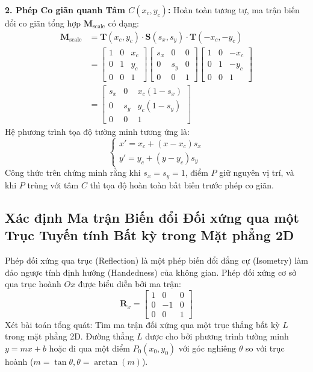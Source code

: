 \textbf{2. Phép Co giãn quanh Tâm $C(x_c, y_c)$:}
Hoàn toàn tương tự, ma trận biến đổi co giãn tổng hợp $\mathbf{M}_{\text{scale}}$ có dạng:
\begin{align}
\label{eq:scale_pivot_composite}
\mathbf{M}_{\text{scale}} &= \mathbf{T}(x_c, y_c) \cdot \mathbf{S}(s_x, s_y) \cdot \mathbf{T}(-x_c, -y_c) \nonumber \\
&= \begin{bmatrix} 1 & 0 & x_c \\ 0 & 1 & y_c \\ 0 & 0 & 1 \end{bmatrix} \begin{bmatrix} s_x & 0 & 0 \\ 0 & s_y & 0 \\ 0 & 0 & 1 \end{bmatrix} \begin{bmatrix} 1 & 0 & -x_c \\ 0 & 1 & -y_c \\ 0 & 0 & 1 \end{bmatrix} \nonumber \\
&= \begin{bmatrix} s_x & 0 & x_c(1 - s_x) \\ 0 & s_y & y_c(1 - s_y) \\ 0 & 0 & 1 \end{bmatrix}
\end{align}
Hệ phương trình tọa độ tường minh tương ứng là:
\begin{equation}
\label{eq:scale_pivot_explicit}
\begin{cases}
x' = x_c + (x - x_c)s_x \\
y' = y_c + (y - y_c)s_y
\end{cases}
\end{equation}
Công thức trên chứng minh rằng khi $s_x = s_y = 1$, điểm $P$ giữ nguyên vị trí, và khi $P$ trùng với tâm $C$ thì tọa độ hoàn toàn bất biến trước phép co giãn.

\subsection{Xác định Ma trận Biến đổi Đối xứng qua một Trục Tuyến tính Bất kỳ trong Mặt phẳng 2D}
\label{subsec:reflection_arbitrary_axis}

Phép đối xứng qua trục (Reflection) là một phép biến đổi đẳng cự (Isometry) làm đảo ngược tính định hướng (Handedness) của không gian. Phép đối xứng cơ sở qua trục hoành $Ox$ được biểu diễn bởi ma trận:
\begin{equation}
\mathbf{R}_x = \begin{bmatrix} 1 & 0 & 0 \\ 0 & -1 & 0 \\ 0 & 0 & 1 \end{bmatrix}
\end{equation}
Xét bài toán tổng quát: Tìm ma trận đối xứng qua một trục thẳng bất kỳ $L$ trong mặt phẳng 2D. Đường thẳng $L$ được cho bởi phương trình tường minh $y = mx + b$ hoặc đi qua một điểm $P_0(x_0, y_0)$ với góc nghiêng $\theta$ so với trục hoành ($m = \tan\theta, \theta = \arctan(m)$).

